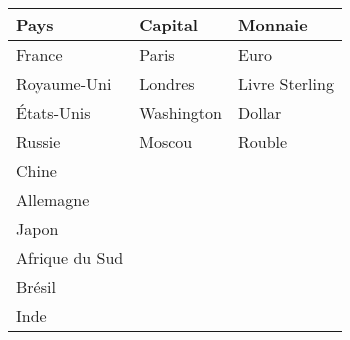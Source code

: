 \documentclass[a4paper]{report}
\begin{document}

\begin{flushleft}
\begin{tabular}{| l | l | l ||}
  \hline
  \textbf{Pays} & \textbf{Capital} & \textbf{Monnaie}  \\  \hline
  France & Paris & Euro \\  \hline
  Royaume-Uni & Londres & Livre Sterling \\  \hline
  États-Unis & Washington & Dollar \\  \hline
  Russie & Moscou & Rouble \\  \hline
  Chine & & \\  \hline
  Allemagne & & \\  \hline
  Japon & & \\  \hline
  Afrique du Sud & & \\  \hline
  Brésil & & \\  \hline
  Inde & & \\
  \hline
\end{tabular}
\end{flushleft}
\end{document}
